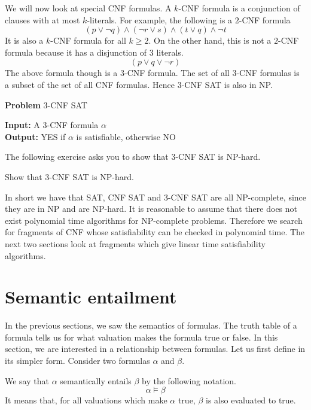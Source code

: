 We will now look at special CNF formulas. A $k$-CNF formula    is a conjunction of clauses with at most $k$-literals. For example, the following is a $2$-CNF formula 
\[
(p \vee \neg q) \wedge (\neg r \vee s) \wedge (t \vee q) \wedge \neg t
\]
It is also a $k$-CNF formula for all $k \geq 2$. On the other hand, this is not a $2$-CNF formula because it has a disjunction of $3$ literals.
\[
(p \vee q \vee \neg r)
\]
The above formula though is a $3$-CNF formula. The set of all $3$-CNF formulas is a subset of the set of all CNF formulas. Hence $3$-CNF SAT is also in NP. 

\begin{problem}
\caption*{{\bf Problem} $3$-CNF SAT}
{\bf Input: } A $3$-CNF formula $\alpha$ \\
{\bf Output: } YES if $\alpha$ is satisfiable, otherwise NO
\label{prblm:3cnfsat}
\end{problem}

The following exercise asks you to show that $3$-CNF SAT is NP-hard. 
\begin{exercise}
Show that $3$-CNF SAT is NP-hard.
\end{exercise}

In short we have that SAT, CNF SAT and $3$-CNF SAT are all NP-complete, since they are in NP and are NP-hard. It is reasonable to assume that there does not exist polynomial time algorithms for NP-complete problems. Therefore we search for fragments of CNF whose satisfiability can be checked in polynomial time. The next two sections look at fragments which give linear time satisfiability algorithms.

\section{Semantic entailment}
In the previous sections, we saw the semantics of formulas. The truth table of a formula tells us for what valuation makes the formula true or false. In this section, we are interested in a relationship between formulas. Let us first define  in its simpler form. Consider two formulas $\alpha$ and $\beta$. 

\begin{definition}
We say that $\alpha$ semantically entails $\beta$ by the following notation.
\[
\alpha \models \beta
\]
It means that, for all valuations which make $\alpha$ true, $\beta$ is also evaluated to true. 
\label{def:semantic}
\end{definition}

